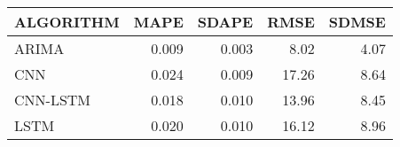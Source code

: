 \begin{tabular}{lrrrr}
\toprule
ALGORITHM &  MAPE &  SDAPE &  RMSE &  SDMSE \\
\midrule
    ARIMA & 0.009 &  0.003 &  8.02 &   4.07 \\
      CNN & 0.024 &  0.009 & 17.26 &   8.64 \\
 CNN-LSTM & 0.018 &  0.010 & 13.96 &   8.45 \\
     LSTM & 0.020 &  0.010 & 16.12 &   8.96 \\
\bottomrule
\end{tabular}
